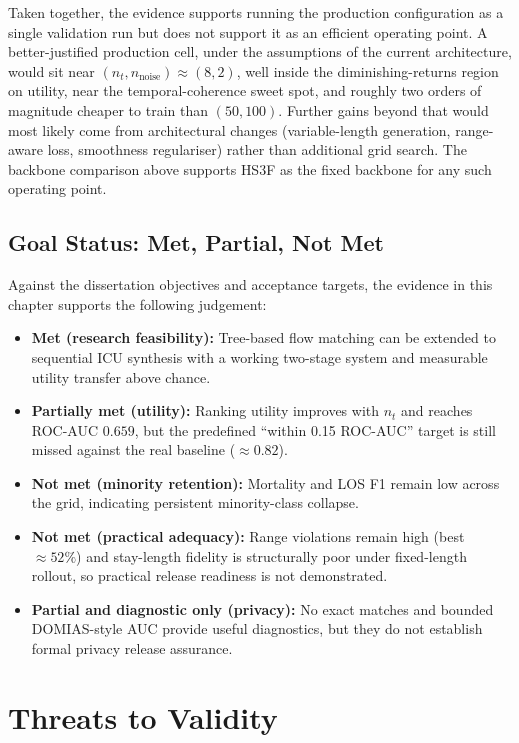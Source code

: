 Taken together, the evidence supports running the production configuration as a single validation run but does not support it as an efficient operating point. A better-justified production cell, under the assumptions of the current architecture, would sit near $(n_t, n_{\text{noise}}){\approx}(8, 2)$, well inside the diminishing-returns region on utility, near the temporal-coherence sweet spot, and roughly two orders of magnitude cheaper to train than $(50, 100)$. Further gains beyond that would most likely come from architectural changes (variable-length generation, range-aware loss, smoothness regulariser) rather than additional grid search. The backbone comparison above supports HS3F as the fixed backbone for any such operating point.

\subsection{Goal Status: Met, Partial, Not Met}

Against the dissertation objectives and acceptance targets, the evidence in this chapter supports the following judgement:
\begin{itemize}\tightlist
    \item \textbf{Met (research feasibility):} Tree-based flow matching can be extended to sequential ICU synthesis with a working two-stage system and measurable utility transfer above chance.
    \item \textbf{Partially met (utility):} Ranking utility improves with $n_t$ and reaches ROC-AUC $0.659$, but the predefined ``within 0.15 ROC-AUC'' target is still missed against the real baseline ($\approx 0.82$).
    \item \textbf{Not met (minority retention):} Mortality and LOS F1 remain low across the grid, indicating persistent minority-class collapse.
    \item \textbf{Not met (practical adequacy):} Range violations remain high (best $\approx 52\%$) and stay-length fidelity is structurally poor under fixed-length rollout, so practical release readiness is not demonstrated.
    \item \textbf{Partial and diagnostic only (privacy):} No exact matches and bounded DOMIAS-style AUC provide useful diagnostics, but they do not establish formal privacy release assurance.
\end{itemize}

\section{Threats to Validity}
\label{sec:threats-to-validity}

